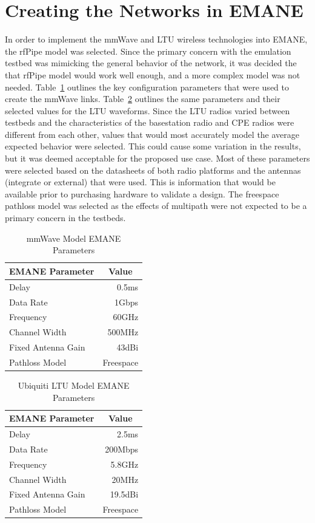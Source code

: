 \section{Creating the Networks in EMANE}
In order to implement the mmWave and LTU wireless technologies into EMANE, the rfPipe model was selected.
Since the primary concern with the emulation testbed was mimicking the general behavior of the network, it was decided the that rfPipe model would work well enough, and a more complex model was not needed.
Table~\ref{mmwave_params} outlines the key configuration parameters that were used to create the mmWave links.
Table~\ref{ltu_params} outlines the same parameters and their selected values for the LTU waveforms.
Since the LTU radios varied between testbeds and the characteristics of the basestation radio and CPE radios were different from each other, values that would most accurately model the average expected behavior were selected.
This could cause some variation in the results, but it was deemed acceptable for the proposed use case.
Most of these parameters were selected based on the datasheets of both radio platforms and the antennas (integrate or external) that were used.
This is information that would be available prior to purchasing hardware to validate a design.
The freespace pathloss model was selected as the effects of multipath were not expected to be a primary concern in the testbeds.\par
\begin{table}[!ht]
\centering
\caption{mmWave Model EMANE Parameters}
\begin{tabular}{lr} 
\hline
\multicolumn{1}{c}{EMANE Parameter} & \multicolumn{1}{c}{Value} \\ 
\hline
Delay & 0.5ms \\
Data Rate & 1Gbps \\
Frequency & 60GHz \\
Channel Width & 500MHz \\
Fixed Antenna Gain & 43dBi \\
Pathloss Model & \multicolumn{1}{l}{Freespace} \\
\hline
\end{tabular}
\label{mmwave_params}
\end{table}
\begin{table}[!ht]
\centering
\caption{Ubiquiti LTU Model EMANE Parameters}
\begin{tabular}{lr} 
\hline
\multicolumn{1}{c}{EMANE Parameter} & \multicolumn{1}{c}{Value} \\ 
\hline
Delay & 2.5ms \\
Data Rate & 200Mbps \\
Frequency & 5.8GHz \\
Channel Width & 20MHz \\
Fixed Antenna Gain & 19.5dBi \\
Pathloss Model & \multicolumn{1}{l}{Freespace} \\
\hline
\end{tabular}
\label{ltu_params}
\end{table}
